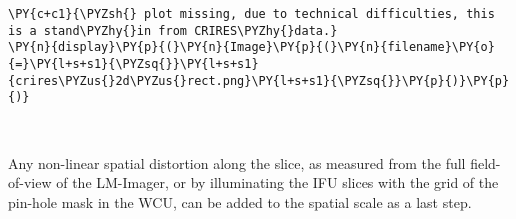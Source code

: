     \begin{tcolorbox}[breakable, size=fbox, boxrule=1pt, pad at break*=1mm,colback=cellbackground, colframe=cellborder]
\begin{Verbatim}[commandchars=\\\{\}]
\PY{c+c1}{\PYZsh{} plot missing, due to technical difficulties, this is a stand\PYZhy{}in from CRIRES\PYZhy{}data.}
\PY{n}{display}\PY{p}{(}\PY{n}{Image}\PY{p}{(}\PY{n}{filename}\PY{o}{=}\PY{l+s+s1}{\PYZsq{}}\PY{l+s+s1}{crires\PYZus{}2d\PYZus{}rect.png}\PY{l+s+s1}{\PYZsq{}}\PY{p}{)}\PY{p}{)}
\end{Verbatim}
\end{tcolorbox}

    \begin{center}
    \end{center}
    { \hspace*{\fill} \\}
    
    Any non-linear spatial distortion along the slice, as measured from the
full field-of-view of the LM-Imager, or by illuminating the IFU slices
with the grid of the pin-hole mask in the WCU, can be added to the
spatial scale as a last step.

